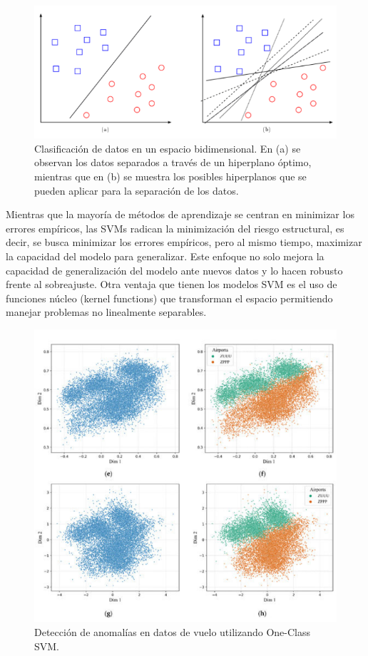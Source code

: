 \documentclass[11pt,a4paper,spanish]{book}
\numberwithin{equation}{chapter}
\numberwithin{figure}{chapter}
\begin{document}
\begin{figure}[h]
    \centering
    \includegraphics[width=1.0\textwidth]{media/svm-dm.png}
    \caption{Clasificación de datos en un espacio bidimensional. En (a) se observan los datos separados a través de un hiperplano óptimo, mientras que en (b) se muestra los posibles hiperplanos que se pueden aplicar para la separación de los datos.  \protect\cite{suarez2014svm} }
    \label{fig:figSVM}
\end{figure}


Mientras que la mayoría de métodos de aprendizaje se centran en minimizar los errores empíricos, las SVMs radican la minimización del riesgo estructural, es decir, se busca minimizar los errores empíricos, pero al mismo tiempo, maximizar la capacidad del modelo para generalizar. Este enfoque no solo mejora la capacidad de generalización del modelo ante nuevos datos y lo hacen robusto frente al sobreajuste. Otra ventaja que tienen los modelos SVM es el uso de funciones núcleo (kernel functions) que transforman el espacio permitiendo manejar problemas no linealmente separables. 


\begin{figure}[h]
    \centering
    \includegraphics[width=1.0\textwidth]{media/svm-kun.png}
    \caption{Detección de anomalías en datos de vuelo utilizando One-Class SVM.  \protect\cite{qin2022flight} }
    \label{fig:figSVMflight}
\end{figure}
\end{document}

